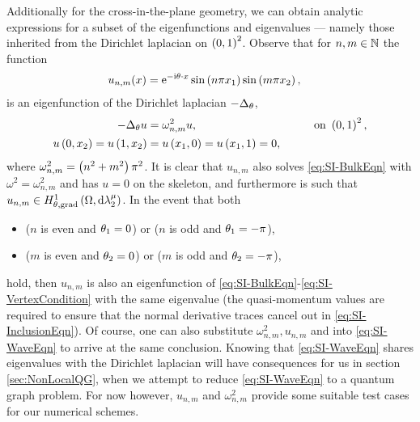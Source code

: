 Additionally for the cross-in-the-plane geometry, we can obtain analytic expressions for a subset of the eigenfunctions and eigenvalues --- namely those inherited from the Dirichlet laplacian on $\left( 0,1 \right)^2$.
Observe that for $n,m\in\mathbb{N}$ the function
\begin{align*}
	u_{n,m}(x) &= \mathrm{e}^{-\mathrm{i}\theta\cdot x}\sin\left( n\pi x_1 \right)\sin\left( m\pi x_2 \right),
\end{align*}
is an eigenfunction of the Dirichlet laplacian $-\Delta_{\theta}$,
\begin{align*}
	-\Delta_{\theta}u &= \omega_{n,m}^2 u, &\qquad \text{on } \left( 0,1 \right)^2, \\
	u\left( 0,x_2 \right) = u\left( 1,x_2 \right) &= u\left( x_1,0 \right) = u\left( x_1,1 \right) = 0,
\end{align*}
where $\omega_{n,m}^2 = \left( n^2+m^2 \right)\pi^2$.
It is clear that $u_{n,m}$ also solves \eqref{eq:SI-BulkEqn} with $\omega^2 = \omega_{n,m}^2$ and has $u=0$ on the skeleton, and furthermore is such that $u_{n,m}\in H^1_{\theta, \mathrm{grad}}\left( \Omega, \mathrm{d}\lambda_2^{\mu} \right)$.
In the event that both
\begin{itemize}
	\item ($n$ is even and $\theta_1=0$) or ($n$ is odd and $\theta_1=-\pi$),
	\item ($m$ is even and $\theta_2=0$) or ($m$ is odd and $\theta_2=-\pi$),
\end{itemize}
hold, then $u_{n,m}$ is also an eigenfunction of \eqref{eq:SI-BulkEqn}-\eqref{eq:SI-VertexCondition} with the same eigenvalue (the quasi-momentum values are required to ensure that the normal derivative traces cancel out in \eqref{eq:SI-InclusionEqn}).
Of course, one can also substitute $\omega^2_{n,m}, u_{n,m}$ and into \eqref{eq:SI-WaveEqn} to arrive at the same conclusion.
Knowing that \eqref{eq:SI-WaveEqn} shares eigenvalues with the Dirichlet laplacian will have consequences for us in section \ref{sec:NonLocalQG}, when we attempt to reduce \eqref{eq:SI-WaveEqn} to a quantum graph problem.
For now however, $u_{n,m}$ and $\omega_{n,m}^2$ provide some suitable test cases for our numerical schemes.